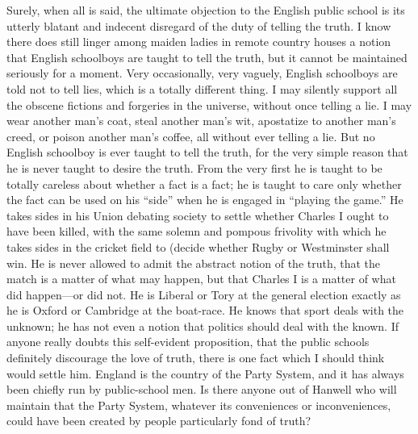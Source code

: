 \documentclass{book}
\begin{document}
Surely, when all is said, the ultimate objection to the English public school is its utterly blatant and indecent disregard of the duty of telling the truth. I know there does still linger among maiden ladies in remote country houses a notion that English schoolboys are taught to tell the truth, but it cannot be maintained seriously for a moment. Very occasionally, very vaguely, English schoolboys are told not to tell lies, which is a totally different thing. I may silently support all the obscene fictions and forgeries in the universe, without once telling a lie. I may wear another man’s coat, steal another man’s wit, apostatize to another man’s creed, or poison another man’s coffee, all without ever telling a lie. But no English schoolboy is ever taught to tell the truth, for the very simple reason that he is never taught to desire the truth. From the very first he is taught to be totally careless about whether a fact is a fact; he is taught to care only whether the fact can be used on his “side” when he is engaged in “playing the game.” He takes sides in his Union debating society to settle whether Charles I ought to have been killed, with the same solemn and pompous frivolity with which he takes sides in the cricket field to (decide whether Rugby or Westminster shall win. He is never allowed to admit the abstract notion of the truth, that the match is a matter of what may happen, but that Charles I is a matter of what did happen—or did not. He is Liberal or Tory at the general election exactly as he is Oxford or Cambridge at the boat-race. He knows that sport deals with the unknown; he has not even a notion that politics should deal with the known. If anyone really doubts this self-evident proposition, that the public schools definitely discourage the love of truth, there is one fact which I should think would settle him. England is the country of the Party System, and it has always been chiefly run by public-school men. Is there anyone out of Hanwell who will maintain that the Party System, whatever its conveniences or inconveniences, could have been created by people particularly fond of truth?
\end{document}
